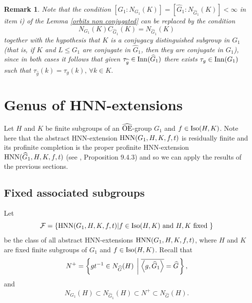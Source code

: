 \documentclass[a4paper,12pt]{article}
\newcommand{\Oe}{\rm \widehat{OE}}
\def\aut {{\rm Aut}}
\def\out {{\rm Out}}
\def\inn {{\rm Inn}}
\def\hnn {{\rm HNN}}
\def\Iso {{\rm Iso}}
\newtheorem{rem}[thm]{Remark}
\begin{document}
{\begin{rem} \label{altenative conditions}
Note that the condition $[G_1:N_{G_1}(K)]=[\widehat G_1:N_{\widehat G_1}(K)]<\infty$ in item i) of the Lemma \ref{orbits non conjugated} can be replaced by the condition $$N_{G_1}(K)C_{\widehat G_1}(K)=N_{\widehat G_1}(K)$$ together with the hypothesis that $K$ is a conjugacy distinguished subgroup in $G_1$ (that is, if $K$ and $L \leq G_1$ are conjugate in $\widehat G_1$, then they are conjugate in $G_1$), since in both cases it follows that given $\tau_{\widehat g} \in \inn(\widehat G_1)$ there exists $\tau_{g} \in \inn(G_1)$ such that $\tau_{\hat{g}}(k)=\tau_{g}(k), \, \forall k \in K.$
\end{rem}


\section{Genus of HNN-extensions}\label{secao 5}

Let $H$ and $K$ be finite subgroups of an $\Oe$-group $G_1$ and $f\in \Iso(H,K)$. 
Note here that the abstract HNN-extension $\hnn(G_1, H, K, f,t)$  is residually finite and its profinite completion is the proper profinite HNN-extension $\hnn(\widehat{G}_1, H, K, f,t)$ (see \cite{RZ}, Proposition 9.4.3)   and so we can apply the results of the previous sections.

\subsection{Fixed associated subgroups} \label{section 5 1}

Let  $$\mathcal{F}=\{ \hnn(G_1, H, K, f, t) | f \in \Iso(H,K) \mbox{ and } H, K \mbox{ fixed  }\}$$ be the class of all  
abstract HNN-extensions $\hnn(G_1, H,K, f, t)$, where $H$ and $K$ are fixed finite subgroups of $G_1$ and $f \in \Iso(H,K)$. 
Recall that
\begin{equation*}%
N^+=\left\{ gt^{- 1} \in N_{\widehat G}(H) \hspace{0.1cm} \left| \hspace{0.1cm}  \overline{\left\langle g, \widehat G_1 \right\rangle}=\widehat G \right. \right\},   
\end{equation*} and  \begin{equation} \label{cadeia de N mais etc} N_{ G_1}(H) \subset N_{\widehat G_1}(H) \subset N^{+} \subset N_{\widehat G}(H). \end{equation} 

}
\end{document}
